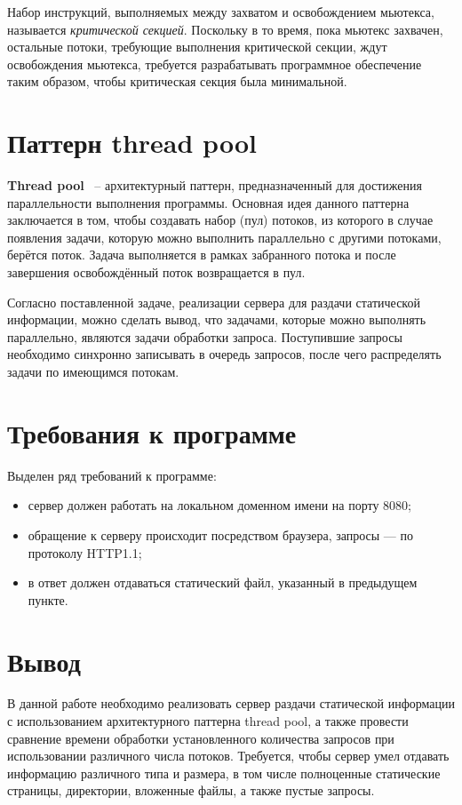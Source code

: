 Набор инструкций, выполняемых между захватом и освобождением мьютекса, называется \textit{критической секцией}. 
Поскольку в то время, пока мьютекс захвачен, остальные потоки, требующие выполнения критической секции, ждут освобождения мьютекса, требуется разрабатывать программное обеспечение таким образом, чтобы критическая секция была минимальной.

\section{Паттерн thread pool}
\textbf{Thread pool}~\cite{thread-pool}	 -- архитектурный паттерн, предназначенный для достижения параллельности выполнения программы. 
Основная идея данного паттерна заключается в том, чтобы создавать набор (пул) потоков, из которого в случае появления задачи, которую можно выполнить параллельно с другими потоками, берётся поток.
Задача выполняется в рамках забранного потока и после завершения освобождённый поток возвращается в пул.

Согласно поставленной задаче, реализации сервера для раздачи статической информации, можно сделать вывод, что задачами, которые можно выполнять параллельно, являются задачи обработки запроса. Поступившие запросы необходимо синхронно записывать в очередь запросов, после чего распределять задачи по имеющимся потокам.

\section{Требования к программе}
Выделен ряд требований к программе:
\begin{itemize}[label=---]
	\item сервер должен работать на локальном доменном имени на порту 8080;
	\item обращение к серверу происходит посредством браузера, запросы --- по протоколу HTTP1.1;
	\item в ответ должен отдаваться статический файл, указанный в предыдущем пункте.
\end{itemize}

\section*{Вывод}
В данной работе необходимо реализовать сервер раздачи статической информации с использованием архитектурного паттерна thread pool, а также провести сравнение времени обработки установленного количества запросов при использовании различного числа потоков. Требуется, чтобы сервер умел отдавать информацию различного типа и размера, в том числе полноценные статические страницы, директории, вложенные файлы, а также пустые запросы.